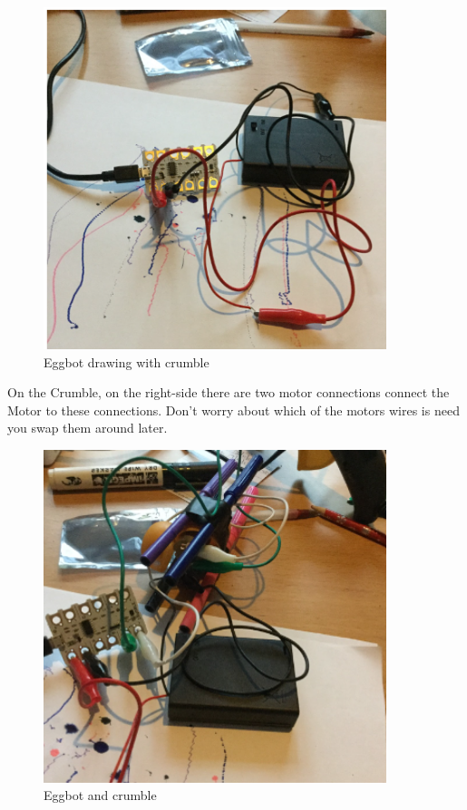 \begin{figure}
    \centering
    \includegraphics[width=10cm]{chapters/ChapterP1/figures/eggbot_stage4.png}
    \caption{Eggbot drawing with crumble}
    \label{fig:EgggbotdrawingCrumble}
\end{figure}

On the Crumble, on the right-side there are two motor connections connect the Motor to these connections. Don’t worry about which of the motors wires is need you swap them around later.

\begin{figure}
    \centering
    \includegraphics[width=10cm]{chapters/ChapterP1/figures/eggbot_stage5.png}
    \caption{Eggbot and crumble}
    \label{fig:EgggbotdrawingCrumble2}
\end{figure}

